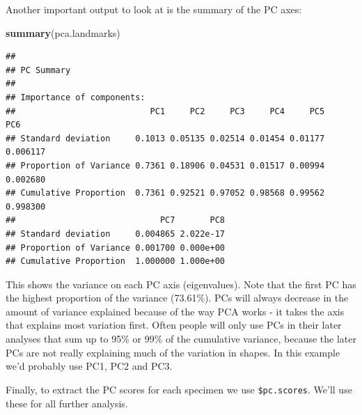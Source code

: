 \documentclass[]{book}
\newenvironment{Shaded}{\begin{snugshade}}{\end{snugshade}}
\newcommand{\KeywordTok}[1]{\textcolor[rgb]{0.13,0.29,0.53}{\textbf{{#1}}}}
\newcommand{\NormalTok}[1]{{#1}}
\begin{document}
Another important output to look at is the summary of the PC axes:

\begin{Shaded}
\begin{Highlighting}[]
\KeywordTok{summary}\NormalTok{(pca.landmarks)}
\end{Highlighting}
\end{Shaded}

\begin{verbatim}
## 
## PC Summary
## 
## Importance of components:
##                           PC1     PC2     PC3     PC4     PC5      PC6
## Standard deviation     0.1013 0.05135 0.02514 0.01454 0.01177 0.006117
## Proportion of Variance 0.7361 0.18906 0.04531 0.01517 0.00994 0.002680
## Cumulative Proportion  0.7361 0.92521 0.97052 0.98568 0.99562 0.998300
##                             PC7       PC8
## Standard deviation     0.004865 2.022e-17
## Proportion of Variance 0.001700 0.000e+00
## Cumulative Proportion  1.000000 1.000e+00
\end{verbatim}

This shows the variance on each PC axis (eigenvalues). Note that the
first PC has the highest proportion of the variance (73.61\%). PCs will
always decrease in the amount of variance explained because of the way
PCA works - it takes the axis that explains most variation first. Often
people will only use PCs in their later analyses that sum up to 95\% or
99\% of the cumulative variance, because the later PCs are not really
explaining much of the variation in shapes. In this example we'd
probably use PC1, PC2 and PC3.

Finally, to extract the PC scores for each specimen we use
\texttt{\$pc.scores}. We'll use these for all further analysis.

\begin{Shaded}
\end{Shaded}
\end{document}
